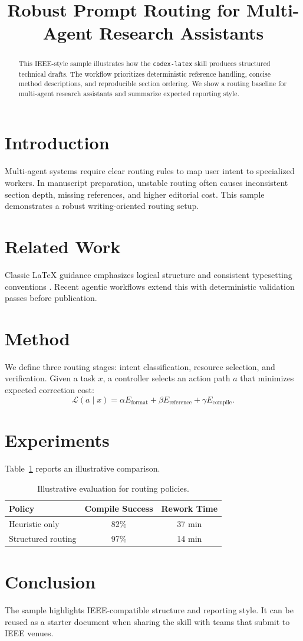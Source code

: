\documentclass[conference]{IEEEtran}
\title{Robust Prompt Routing for Multi-Agent Research Assistants}
\author{\IEEEauthorblockN{Anonymous Research Team}}
\begin{document}
\maketitle

\begin{abstract}
This IEEE-style sample illustrates how the \texttt{codex-latex} skill produces structured technical drafts.
The workflow prioritizes deterministic reference handling, concise method descriptions, and reproducible section ordering.
We show a routing baseline for multi-agent research assistants and summarize expected reporting style.
\end{abstract}

\section{Introduction}
Multi-agent systems require clear routing rules to map user intent to specialized workers.
In manuscript preparation, unstable routing often causes inconsistent section depth, missing references, and higher editorial cost.
This sample demonstrates a robust writing-oriented routing setup.

\section{Related Work}
Classic LaTeX guidance emphasizes logical structure and consistent typesetting conventions \cite{lamport1994}.
Recent agentic workflows extend this with deterministic validation passes before publication.

\section{Method}
We define three routing stages: intent classification, resource selection, and verification.
Given a task $x$, a controller selects an action path $a$ that minimizes expected correction cost:
\begin{equation}
\mathcal{L}(a \mid x) = \alpha E_{\text{format}} + \beta E_{\text{reference}} + \gamma E_{\text{compile}}.
\end{equation}

\section{Experiments}
Table~\ref{tab:ieee-results} reports an illustrative comparison.

\begin{table}[t]
\caption{Illustrative evaluation for routing policies.}
\label{tab:ieee-results}
\centering
\begin{tabular}{lcc}
\toprule
Policy & Compile Success & Rework Time \\
\midrule
Heuristic only & 82\% & 37 min \\
Structured routing & 97\% & 14 min \\
\bottomrule
\end{tabular}
\end{table}

\section{Conclusion}
The sample highlights IEEE-compatible structure and reporting style.
It can be reused as a starter document when sharing the skill with teams that submit to IEEE venues.



\end{document}
